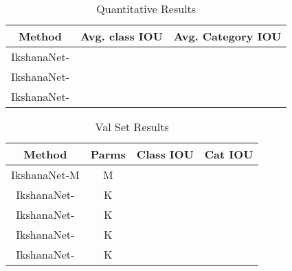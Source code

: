 \documentclass{article}
\begin{document}
\begin{table}
\begin{center}
\begin{tabular}{|c|c|c|}
\hline
Method & Avg. class IOU & Avg. Category IOU\\
\hline 
IkshanaNet- &  &  \\
\hline
IkshanaNet- &  &  \\
\hline
IkshanaNet- &  & \\
\hline
\end{tabular}
\end{center}
\caption{Quantitative Results}
\end{table}
\begin{table}
\begin{center}
\begin{tabular}{|c|c|c|c|}
\hline
Method & Parms & Class IOU & Cat IOU\\
\hline 
IkshanaNet-M & M&  & \\
\hline 
IkshanaNet- & K&  & \\
\hline
IkshanaNet- & K &  &  \\
\hline
IkshanaNet- & K &  & \\
\hline
IkshanaNet- & K &  &  \\
\hline
\end{tabular}
\end{center}
\caption{Val Set Results}
\end{table}
\end{document}
